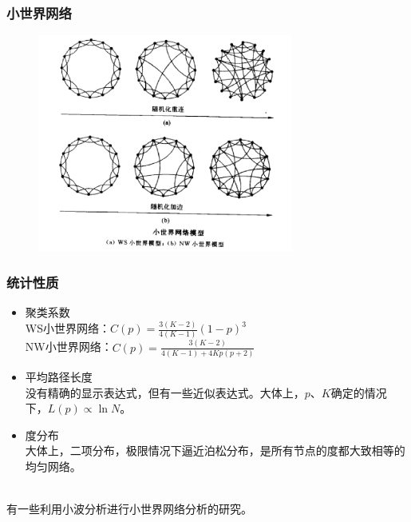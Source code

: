 	\begin{frame}
		\frametitle{小世界网络}
	
		\begin{figure}[htbp]
		\centering
		\includegraphics[width=0.75\textwidth, bb = 0 0 1024 870]{pic/01-smallw.png}
		\end{figure}
	
	\end{frame}


	\begin{frame}
		\frametitle{统计性质}
	
		\begin{itemize}
			\item 聚类系数 \\
				WS小世界网络：$C(p) = \frac{3(K-2)}{4(K-1)}(1-p)^3$ \\
				NW小世界网络：$C(p) = \frac{3(K-2)}{4(K-1) + 4Kp(p+2)}$ 
			\item 平均路径长度 \\
				没有精确的显示表达式，但有一些近似表达式。大体上，$p、K$确定的情况下，$L(p) \propto \ln N$。
			\item 度分布 \\
				大体上，二项分布，极限情况下逼近泊松分布，是所有节点的度都大致相等的均匀网络。
		\end{itemize}
		~\\
		有一些利用小波分析进行小世界网络分析的研究。
	\end{frame}

